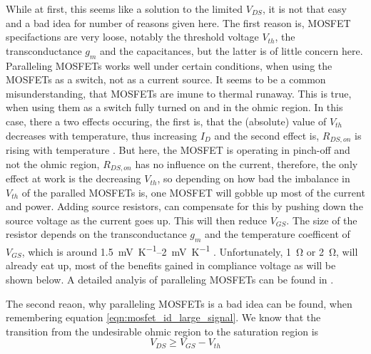 While at first, this seems like a solution to the limited $V_{DS}$, it is not that easy and a bad idea for number of reasons given here. The first reason is, MOSFET specifactions are very loose, notably the threshold voltage $V_{th}$, the transconductance $g_m$ and the capacitances, but the latter is of little concern here. Paralleling MOSFETs works well under certain conditions, when using the MOSFETs as a switch, not as a current source. It seems to be a common misunderstanding, that MOSFETs are imune to thermal runaway. This is true, when using them as a switch fully turned on and in the ohmic region. In this case, there a two effects occuring, the first is, that the (absolute) value of $V_{th}$ decreases with temperature, thus increasing $I_D$ and the second effect is, $R_{DS,on}$ is rising with temperature \cite{mosfet_thermal_runaway}. But here, the MOSFET is operating in pinch-off and not the ohmic region, $R_{DS,on}$ has no influence on the current, therefore, the only effect at work is the decreasing $V_{th}$, so depending on how bad the imbalance in $V_{th}$ of the paralled MOSFETs is, one MOSFET will gobble up most of the current and power. Adding source resistors, can compensate for this by pushing down the source voltage as the current goes up. This will then reduce $V_{GS}$. The size of the resistor depends on the transconductance $g_m$ and the temperature coefficent of $V_{GS}$, which is around \qtyrange[range-units = single]{1.5}{2}{\mV \per \K} \cite{mosfet_vgs_tempco}. Unfortunately, \qty{1}{\ohm} or \qty{2}{\ohm}, will already eat up, most of the benefits gained in compliance voltage as will be shown below. A detailed analyis of paralleling MOSFETs can be found in \cite{paralleling_mosfets}.

The second reaon, why paralleling MOSFETs is a bad idea can be found, when
remembering equation \ref{eqn:mosfet_id_large_signal}. We know that the transition from the undesirable ohmic region to the saturation region is
\begin{equation}
    V_{DS} \geq V_{GS} − V_{th}
\end{equation}

